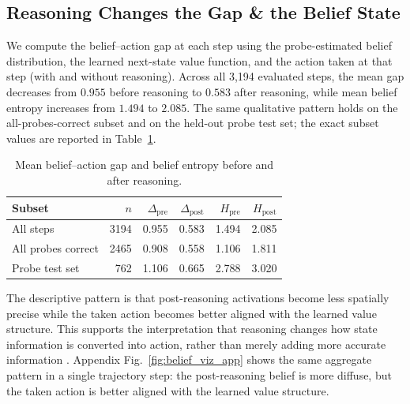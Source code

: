 \documentclass[10pt,twocolumn]{article}
\begin{document}

\subsection{Reasoning Changes the Gap \& the Belief State}

We compute the belief--action gap at each step using the probe-estimated
belief distribution, the learned next-state value function, and the action
taken at that step (with and without reasoning). Across all 3,194 evaluated
steps, the mean gap decreases from $0.955$ before reasoning to $0.583$ after
reasoning, while mean belief entropy increases from $1.494$ to $2.085$. The
same qualitative pattern holds on the all-probes-correct subset and on the
held-out probe test set; the exact subset values are reported in 
Table~\ref{tab:gap_entropy}.

\begin{table}[t]
\centering
\small
\setlength{\tabcolsep}{4pt}
\begin{tabular}{lrrrrr}
\toprule
\textbf{Subset} & \textbf{$n$} &
\textbf{$\Delta_{\mathrm{pre}}$}&
\textbf{$\Delta_{\mathrm{post}}$}&
\textbf{$H_{\mathrm{pre}}$} &
\textbf{$H_{\mathrm{post}}$} \\
\midrule
All steps & 3194 & 0.955 & 0.583 & 1.494 & 2.085 \\
All probes correct & 2465 & 0.908 & 0.558  & 1.106 & 1.811 \\
Probe test set & 762 & 1.106 & 0.665  & 2.788 & 3.020 \\
\bottomrule
\end{tabular}
\caption{Mean belief--action gap and belief entropy before and after reasoning.}\label{tab:gap_entropy}
\end{table}

The descriptive pattern is that post-reasoning activations become less spatially
precise while the taken action becomes better aligned with the learned
value structure. This supports the interpretation that reasoning changes how
state information is converted into action, rather than merely adding more
accurate information \cite{lanham2023measuring, dong2025emergent}.
Appendix Fig.~\ref{fig:belief_viz_app} shows the same aggregate pattern in a single
trajectory step: the post-reasoning belief is more diffuse, but the taken
action is better aligned with the learned value structure.
\end{document}
